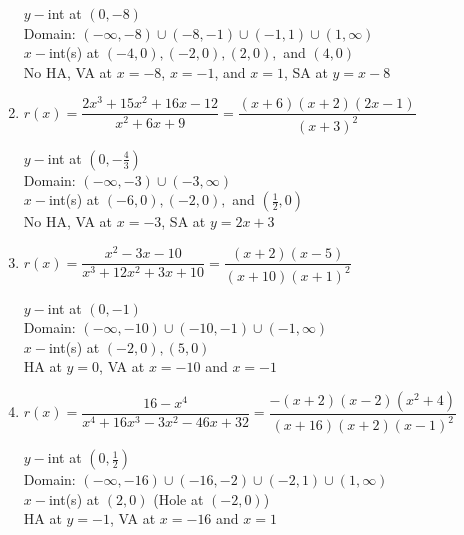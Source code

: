 \documentclass[12pt]{book}
\theoremstyle{definition}
\begin{document}
\begin{enumerate}
				$y-$int at $(0,-8)$\\
				Domain: $(-\infty,-8)\cup(-8,-1)\cup(-1,1)\cup(1,\infty)$\\
				$x-$int(s) at $(-4,0), (-2,0), (2,0),$ and $(4,0)$\\
				No HA, VA at $x=-8$, $x=-1$, and $x=1$, SA at $y=x-8$
				\item $r(x)=\dfrac{2x^3+15x^2+16x-12}{x^2+6x+9}=\dfrac{(x+6)(x+2)(2x-1)}{(x+3)^2}$
				\par
				$y-$int at $(0,-\frac{4}{3})$\\
				Domain: $(-\infty,-3)\cup(-3,\infty)$\\
				$x-$int(s) at $(-6,0), (-2,0),$ and $(\frac{1}{2},0)$\\
				No HA, VA at $x=-3$, SA at $y=2x+3$
				\item $r(x)=\dfrac{x^2-3x-10}{x^3+12x^2+3x+10}=\dfrac{(x+2)(x-5)}{(x+10)(x+1)^2}$
				\par
				$y-$int at $(0,-1)$\\
				Domain: $(-\infty,-10)\cup(-10,-1)\cup(-1,\infty)$\\
				$x-$int(s) at $(-2,0), (5,0)$\\
				HA at $y=0$, VA at $x=-10$ and $x=-1$
				\item $r(x)=\dfrac{16-x^4}{x^4+16x^3-3x^2-46x+32}=\dfrac{-(x+2)(x-2)(x^2+4)}{(x+16)(x+2)(x-1)^2}$
				\par
				$y-$int at $(0,\frac{1}{2})$\\
				Domain: $(-\infty,-16)\cup(-16,-2)\cup(-2,1)\cup(1,\infty)$\\
				$x-$int(s) at $(2,0)$ (Hole at $(-2,0)$)\\
				HA at $y=-1$, VA at $x=-16$ and $x=1$
			\end{enumerate}
\end{document}
